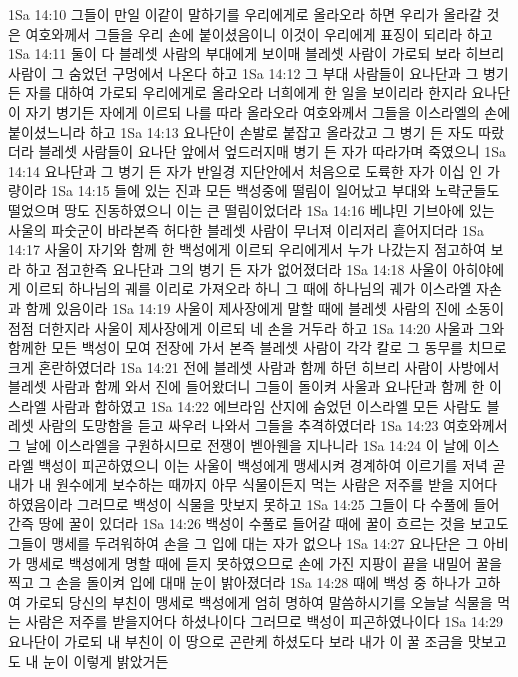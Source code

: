 1Sa 14:10  그들이 만일 이같이 말하기를 우리에게로 올라오라 하면 우리가 올라갈 것은 여호와께서 그들을 우리 손에 붙이셨음이니 이것이 우리에게 표징이 되리라 하고
1Sa 14:11  둘이 다 블레셋 사람의 부대에게 보이매 블레셋 사람이 가로되 보라 히브리 사람이 그 숨었던 구멍에서 나온다 하고
1Sa 14:12  그 부대 사람들이 요나단과 그 병기든 자를 대하여 가로되 우리에게로 올라오라 너희에게 한 일을 보이리라 한지라 요나단이 자기 병기든 자에게 이르되 나를 따라 올라오라 여호와께서 그들을 이스라엘의 손에 붙이셨느니라 하고
1Sa 14:13  요나단이 손발로 붙잡고 올라갔고 그 병기 든 자도 따랐더라 블레셋 사람들이 요나단 앞에서 엎드러지매 병기 든 자가 따라가며 죽였으니
1Sa 14:14  요나단과 그 병기 든 자가 반일경 지단안에서 처음으로 도륙한 자가 이십 인 가량이라
1Sa 14:15  들에 있는 진과 모든 백성중에 떨림이 일어났고 부대와 노략군들도 떨었으며 땅도 진동하였으니 이는 큰 떨림이었더라
1Sa 14:16  베냐민 기브아에 있는 사울의 파숫군이 바라본즉 허다한 블레셋 사람이 무너져 이리저리 흩어지더라
1Sa 14:17  사울이 자기와 함께 한 백성에게 이르되 우리에게서 누가 나갔는지 점고하여 보라 하고 점고한즉 요나단과 그의 병기 든 자가 없어졌더라
1Sa 14:18  사울이 아히야에게 이르되 하나님의 궤를 이리로 가져오라 하니 그 때에 하나님의 궤가 이스라엘 자손과 함께 있음이라
1Sa 14:19  사울이 제사장에게 말할 때에 블레셋 사람의 진에 소동이 점점 더한지라 사울이 제사장에게 이르되 네 손을 거두라 하고
1Sa 14:20  사울과 그와 함께한 모든 백성이 모여 전장에 가서 본즉 블레셋 사람이 각각 칼로 그 동무를 치므로 크게 혼란하였더라
1Sa 14:21  전에 블레셋 사람과 함께 하던 히브리 사람이 사방에서 블레셋 사람과 함께 와서 진에 들어왔더니 그들이 돌이켜 사울과 요나단과 함께 한 이스라엘 사람과 합하였고
1Sa 14:22  에브라임 산지에 숨었던 이스라엘 모든 사람도 블레셋 사람의 도망함을 듣고 싸우러 나와서 그들을 추격하였더라
1Sa 14:23  여호와께서 그 날에 이스라엘을 구원하시므로 전쟁이 벧아웬을 지나니라
1Sa 14:24  이 날에 이스라엘 백성이 피곤하였으니 이는 사울이 백성에게 맹세시켜 경계하여 이르기를 저녁 곧 내가 내 원수에게 보수하는 때까지 아무 식물이든지 먹는 사람은 저주를 받을 지어다 하였음이라 그러므로 백성이 식물을 맛보지 못하고
1Sa 14:25  그들이 다 수풀에 들어간즉 땅에 꿀이 있더라
1Sa 14:26  백성이 수풀로 들어갈 때에 꿀이 흐르는 것을 보고도 그들이 맹세를 두려워하여 손을 그 입에 대는 자가 없으나
1Sa 14:27  요나단은 그 아비가 맹세로 백성에게 명할 때에 듣지 못하였으므로 손에 가진 지팡이 끝을 내밀어 꿀을 찍고 그 손을 돌이켜 입에 대매 눈이 밝아졌더라
1Sa 14:28  때에 백성 중 하나가 고하여 가로되 당신의 부친이 맹세로 백성에게 엄히 명하여 말씀하시기를 오늘날 식물을 먹는 사람은 저주를 받을지어다 하셨나이다 그러므로 백성이 피곤하였나이다
1Sa 14:29  요나단이 가로되 내 부친이 이 땅으로 곤란케 하셨도다 보라 내가 이 꿀 조금을 맛보고도 내 눈이 이렇게 밝았거든
